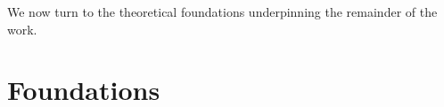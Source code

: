 We now turn to the theoretical foundations underpinning the remainder of the work.

\part{Foundations}







% 

